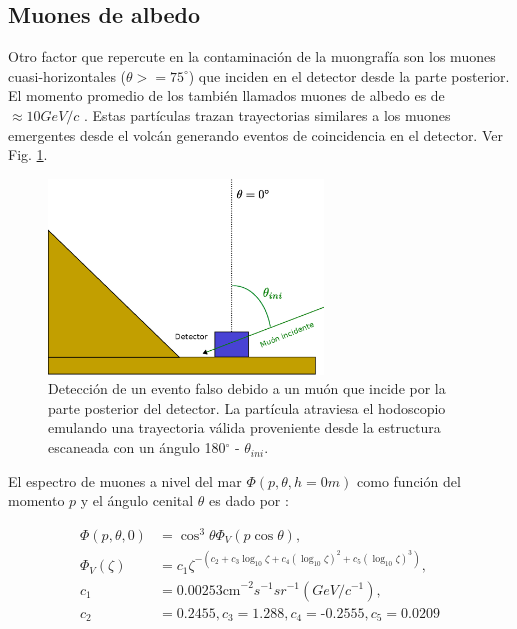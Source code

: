 \subsection{Muones de albedo}

Otro factor que repercute en la contaminación de la muongrafía son los muones cuasi-horizontales ($\theta >= 75^{\circ}$) que inciden en el detector desde la parte posterior. El momento promedio de los también llamados muones de albedo es de $\approx 10 GeV/c$ \cite{Nishiyama2014}. Estas partículas trazan trayectorias similares a los muones emergentes desde el volcán generando eventos de coincidencia en el detector. Ver Fig. \ref{Albedo}.

\begin{figure}[h!]
\begin{center}
\includegraphics[width=0.65\textwidth]{Figures/Albedo.eps}
\caption[Detección de un evento falso debido a un muón que incide por la parte posterior del detector]{Detección de un evento falso debido a un muón que incide por la parte posterior del detector. La partícula atraviesa el hodoscopio emulando una trayectoria válida proveniente desde la estructura escaneada con un ángulo 180$^\circ$ - $\theta_{ini}$.}
\label{Albedo}
\end{center}
\end{figure}

El espectro de muones a nivel del mar $\Phi(p,\theta,h=0m)$ como función del momento $p$ y el ángulo cenital $\theta$ es dado por \cite{Reyna2006}:


\begin{align*}
\Phi(p,\theta,0) &= \cos^3\theta\Phi_V(p \cos \theta),\\
\Phi_V(\zeta) &= c_1 \zeta^{-(c_2+c_3\log_{10}\zeta+c_4(\log_{10}\zeta)^2+c_5(\log_{10}\zeta)^3)},\\
c_1 &= \text{0.00253cm}^{-2}s^{-1}sr^{-1}(GeV/c^{-1}),\\
c_2 &= \text{0.2455},c_3=\text{1.288},c_4=\text{-0.2555},c_5=\text{0.0209}
\end{align*}

